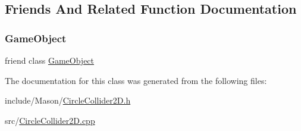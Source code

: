 \subsection{Friends And Related Function Documentation}
\hypertarget{class_mason_1_1_circle_collider2_d_a00df87c957d8f7ee0fc51f07a0542f4a}{}\label{class_mason_1_1_circle_collider2_d_a00df87c957d8f7ee0fc51f07a0542f4a} 
\subsubsection{\texorpdfstring{Game\+Object}{GameObject}}
{\footnotesize\ttfamily friend class \hyperlink{class_mason_1_1_game_object}{Game\+Object}\hspace{0.3cm}{\ttfamily [friend]}}



The documentation for this class was generated from the following files\+:\begin{DoxyCompactItemize}
\item 
include/\+Mason/\hyperlink{_circle_collider2_d_8h}{Circle\+Collider2\+D.\+h}\item 
src/\hyperlink{_circle_collider2_d_8cpp}{Circle\+Collider2\+D.\+cpp}\end{DoxyCompactItemize}
